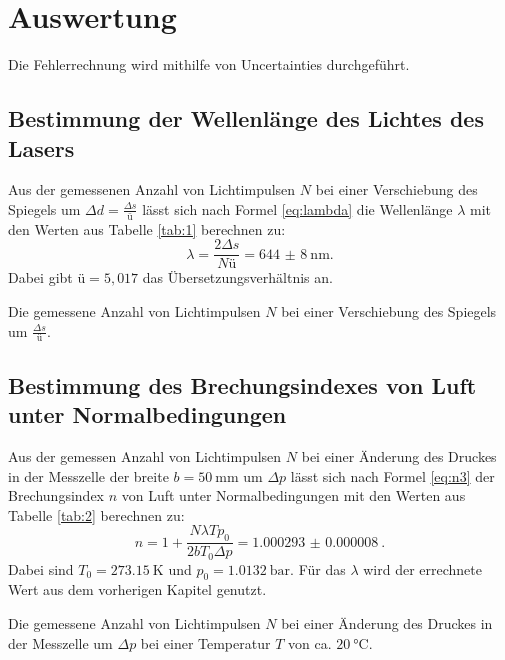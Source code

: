 \section{Auswertung}
\label{sec:Auswertung}

Die Fehlerrechnung wird mithilfe von Uncertainties \cite{uncertainties} durchgeführt.

\subsection{Bestimmung der Wellenlänge des Lichtes des Lasers}

Aus der gemessenen Anzahl von Lichtimpulsen $N$ bei einer Verschiebung des Spiegels um $\Delta d=\frac{\Delta s}{ü}$ lässt sich nach Formel \eqref{eq:lambda} die Wellenlänge $\lambda$ mit den Werten aus Tabelle \ref{tab:1} berechnen zu:
\[
	\lambda = \frac{2\Delta s}{N ü}=\SI{644(8)}{\nano\meter}\text{.}
\]
Dabei gibt $ü=5,017$ das Übersetzungsverhältnis an.

\begin{table}
	\centering
	\caption{Die gemessene Anzahl von Lichtimpulsen $N$ bei einer Verschiebung des Spiegels um $\frac{\Delta s}{ü}$.}
	
	\label{tab:1}
\end{table}

\subsection{Bestimmung des Brechungsindexes von Luft unter Normalbedingungen}

Aus der gemessen Anzahl von Lichtimpulsen $N$ bei einer Änderung des Druckes in der Messzelle der breite $b=\SI{50}{\milli\meter}$ um $\Delta p$ lässt sich nach Formel \eqref{eq:n3} der Brechungsindex $n$ von Luft unter Normalbedingungen mit den Werten aus Tabelle \ref{tab:2} berechnen zu:
\[
	n = 1+ \frac{N \lambda T p_0}{2 b T_0 \Delta p} = \SI{1.000293(8)}{}\text{.}
\]
Dabei sind $T_0=\SI{273,15}{\kelvin}$ und $p_0=\SI{1,0132}{\bar}$. Für das $\lambda$ wird der errechnete Wert aus dem vorherigen Kapitel genutzt.

\begin{table}
	\centering
	\caption{Die gemessene Anzahl von Lichtimpulsen $N$ bei einer Änderung des Druckes in der Messzelle um $\Delta p$ bei einer Temperatur $T$ von ca. $\SI{20}{\degreeCelsius}$.}
	
	\label{tab:2}
\end{table}